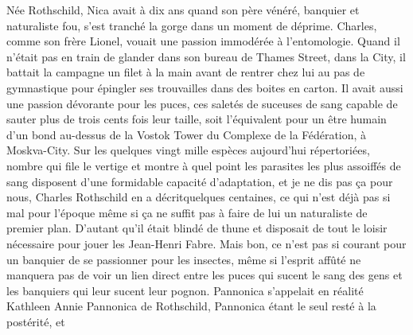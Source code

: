 %
Née Rothschild, Nica avait à dix ans quand son père vénéré, banquier et naturaliste fou, s’est tranché la gorge dans un moment de déprime. Charles, comme son frère Lionel, vouait une passion immodérée à l’entomologie. Quand il n’était pas en train de glander dans son bureau de Thames Street, dans la City, il battait la campagne un filet à la main avant de rentrer chez lui au pas de gymnastique pour épingler ses trouvailles dans des boites en carton. Il avait aussi une passion dévorante pour les puces, ces saletés de suceuses de sang capable de sauter plus de trois cents fois leur taille, soit l’équivalent pour un être humain d’un bond au-dessus de la Vostok Tower du Complexe de la Fédération, à Moskva-City. Sur les quelques vingt mille espèces aujourd’hui répertoriées, nombre qui file le vertige et montre à quel point les parasites les plus assoiffés de sang disposent d’une formidable capacité d’adaptation, et je ne dis pas ça pour nous, Charles Rothschild en a décritquelques centaines, ce qui n’est déjà pas si mal pour l’époque même si ça ne suffit pas à faire de lui un naturaliste de premier plan. D’autant qu’il était blindé de thune et disposait de tout le loisir nécessaire pour jouer les Jean-Henri Fabre. Mais bon, ce n’est pas si courant pour un banquier de se passionner pour les insectes, même si l’esprit affûté ne manquera pas de voir un lien direct entre les puces qui sucent le sang des gens et les banquiers qui leur sucent leur pognon. Pannonica s’appelait en réalité Kathleen Annie Pannonica de Rothschild, Pannonica étant le seul resté à la postérité, et 